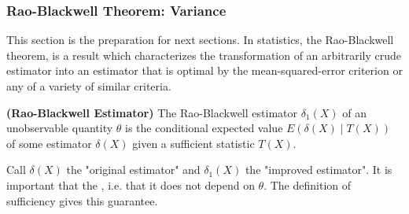 \documentclass{article}
\newcommand{\bfs}[1]{\textbf{({#1}) }}
\begin{document}
\subsubsection{Rao-Blackwell Theorem: Variance}
This section is the preparation for next sections.
In statistics, the Rao-Blackwell theorem, is a result which characterizes the transformation of an arbitrarily crude estimator into an estimator that is optimal by the mean-squared-error criterion or any of a variety of similar criteria.

\begin{defa}\bfs{Rao-Blackwell Estimator}
The Rao-Blackwell estimator $\delta_{1}(X)$ of an unobservable quantity $\theta$ is the conditional expected value $E(\delta(X)\mid T(X))$ of some estimator $\delta(X)$ given a sufficient statistic $T(X)$. 
\end{defa}
\begin{rema}
Call $\delta(X)$ the "original estimator" and $\delta_{1}(X)$ the "improved estimator". It is important that the , i.e. that it does not depend on $\theta$. The  definition of sufficiency gives this guarantee.
\end{rema}
\end{document}
